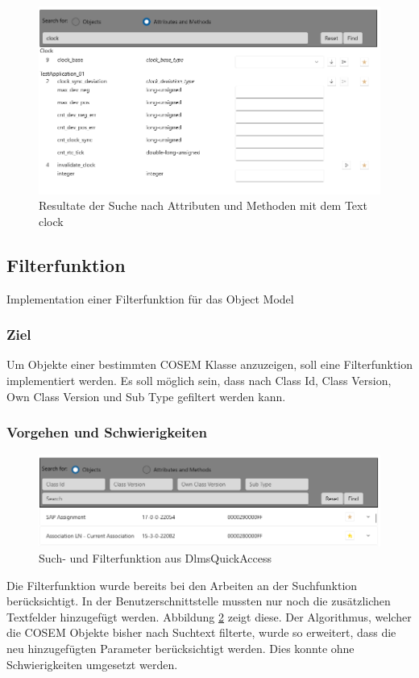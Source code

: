 \begin{figure}
   \centering
   \includegraphics[width=1.0\textwidth]{gfx/searchforclick.png}
   \caption{
      Resultate der Suche nach Attributen und Methoden mit dem Text \dq clock\dq
      }
      \label{fig:searchforClock}
\end{figure}




\subsection{Filterfunktion}
\dq Implementation einer Filterfunktion für das Object Model\dq
\subsubsection{Ziel}
Um Objekte einer bestimmten \ac{COSEM} Klasse anzuzeigen, soll eine Filterfunktion implementiert werden.
Es soll möglich sein, dass nach Class Id, Class Version, Own Class Version und Sub Type gefiltert werden kann.
\subsubsection{Vorgehen und Schwierigkeiten}
\begin{figure}
   \centering
   \includegraphics[width=1.0\textwidth]{gfx/searchfilter.png}
   \caption{
      Such- und Filterfunktion aus DlmsQuickAccess 
      }
      \label{fig:searchfilterUIRel}
\end{figure}
Die Filterfunktion wurde bereits bei den Arbeiten an der Suchfunktion berücksichtigt.
In der Benutzerschnittstelle mussten nur noch die zusätzlichen Textfelder hinzugefügt werden.
Abbildung \ref{fig:searchfilterUIRel} zeigt diese.
Der Algorithmus, welcher die \ac{COSEM} Objekte bisher nach Suchtext filterte, wurde so erweitert, dass die neu hinzugefügten Parameter berücksichtigt werden.
Dies konnte ohne Schwierigkeiten umgesetzt werden.



